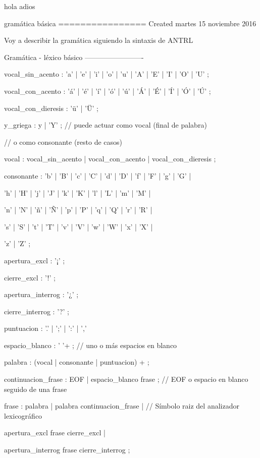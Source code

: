 \documentclass{minimal}
\begin{document}
    
    hola \TTbreve adios
    
    gramática básica
    ================
    Created martes 15 noviembre 2016
    
    Voy a describir la gramática siguiendo la sintaxis de ANTRL
    
    Gramática - léxico básico
    -------------------------
    
    vocal\_sin\_acento	: 'a' | 'e' | 'i' | 'o' | 'u' | 'A' | 'E' | 'I' | 'O' | 'U' ;
    
    vocal\_con\_acento	: 'á' | 'é' | 'í' | 'ó' | 'ú' | 'Á' | 'É' | 'Í' | 'Ó' | 'Ú' ;
    
    vocal\_con\_dieresis	: 'ü' | 'Ü' ;
    
    y\_griega		: y | 'Y' ;							// puede actuar como vocal (final de palabra) 
    
    // o como consonante (resto de casos)
    
    vocal			: vocal\_sin\_acento | vocal\_con\_acento | vocal\_con\_dieresis ;
    
    consonante		: 'b' | 'B' | 'c' | 'C' | 'd' | 'D' | 'f' | 'F' | 'g' | 'G' |
    
    'h' | 'H' | 'j' | 'J' | 'k' | 'K' | 'l' | 'L' | 'm' | 'M' |
    
    'n' | 'N' | 'ñ' | 'Ñ' | 'p' | 'P' | 'q' | 'Q' | 'r' | 'R' |
    
    's' | 'S' | 't' | 'T' | 'v' | 'V' | 'w' | 'W' | 'x' | 'X' |
    
    'z' | 'Z' ;
    
    apertura\_excl		: '¡' ;
    
    cierre\_excl		: '!' ;
    
    apertura\_interrog	: '¿' ;
    
    cierre\_interrog		: '?' ;
    
    puntuacion		: '.' | ';' | ':' | ','
    
    espacio\_blanco		: ' '+ ; 							 // uno o más espacios en blanco
    
    palabra			: (vocal | consonante | puntuacion) + ;
    
    continuacion\_frase	: EOF | espacio\_blanco frase ;					// EOF o espacio en blanco seguido de una frase
    
    frase			: palabra | palabra continuacion\_frase | 			// Símbolo raiz del analizador lexicográfico
    
    apertura\_excl frase cierre\_excl |
    
    apertura\_interrog frase cierre\_interrog ;
    
\end{document}
